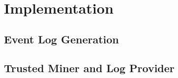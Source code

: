 \section{Implementation}
\subsection{Event Log Generation}
\subsection{Trusted Miner and Log Provider}
